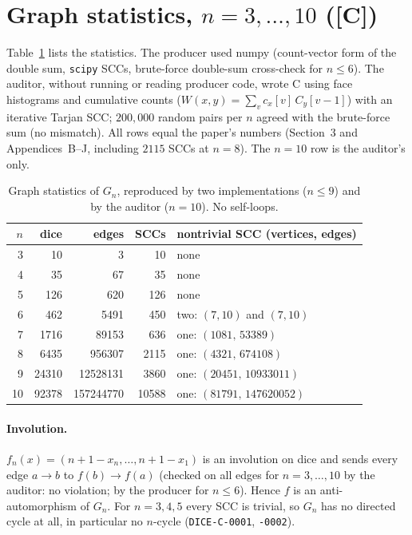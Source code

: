 \documentclass[10pt]{article}
\newcommand{\tier}[1]{\textsf{[#1]}}
\newcommand{\tC}{\tier{C}}
\begin{document}
\section{Graph statistics, $n=3,\dots,10$ (\tC{})}\label{sec:graph}
Table~\ref{tab:g} lists the statistics. The producer used numpy (count-vector form of the double sum, \texttt{scipy} SCCs, brute-force double-sum cross-check for $n\le6$). The auditor, without running or reading producer code, wrote C using face histograms and cumulative counts ($W(x,y)=\sum_v c_x[v]\,C_y[v-1]$) with an iterative Tarjan SCC; $200{,}000$ random pairs per $n$ agreed with the brute-force sum (no mismatch). All rows equal the paper's numbers (Section~3 and Appendices~B--J, including $2115$ SCCs at $n=8$). The $n=10$ row is the auditor's only.
\begin{table}[h]\centering\small
\begin{tabular}{@{}rrrrl@{}}\toprule
$n$ & dice & edges & SCCs & nontrivial SCC (vertices, edges)\\ \midrule
3 & 10 & 3 & 10 & none\\
4 & 35 & 67 & 35 & none\\
5 & 126 & 620 & 126 & none\\
6 & 462 & 5491 & 450 & two: $(7,10)$ and $(7,10)$\\
7 & 1716 & 89153 & 636 & one: $(1081,\,53389)$\\
8 & 6435 & 956307 & 2115 & one: $(4321,\,674108)$\\
9 & 24310 & 12528131 & 3860 & one: $(20451,\,10933011)$\\
10 & 92378 & 157244770 & 10588 & one: $(81791,\,147620052)$\\ \bottomrule
\end{tabular}
\caption{Graph statistics of $G_n$, reproduced by two implementations ($n\le9$) and by the auditor ($n=10$). No self-loops.}\label{tab:g}
\end{table}
\paragraph{Involution.} $f_n(x)=(n+1-x_n,\dots,n+1-x_1)$ is an involution on dice and sends every edge $a\to b$ to $f(b)\to f(a)$ (checked on all edges for $n=3,\dots,10$ by the auditor: no violation; by the producer for $n\le6$). Hence $f$ is an anti-automorphism of $G_n$. For $n=3,4,5$ every SCC is trivial, so $G_n$ has no directed cycle at all, in particular no $n$-cycle (\texttt{DICE-C-0001}, \texttt{-0002}).
\end{document}
